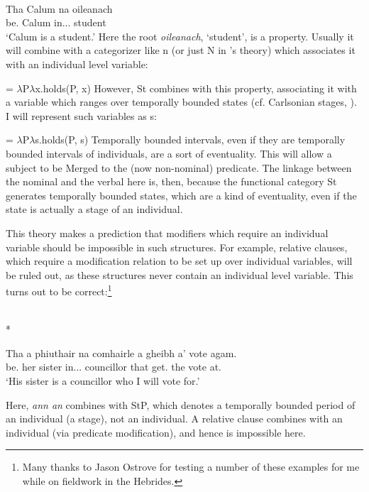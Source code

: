 \documentclass[output=paper]{langsci/langscibook}
\begin{document}
\ea {}\label{adger:ex:62}\\
 \gll  Tha Calum na oileanach\\
be.\Prs{} Calum in.\Poss.\Tsg.\M{} student\\
\glt \enquote*{Calum is a student.}
\z
Here the root \emph{oileanach}, `student', is a property. Usually it will
combine with a categorizer like n (or just N in \citeauthor{adgerbook}
\citeyear{adgerbook}'s theory) which
associates it with an individual level variable:\largerpage

\ea {} = $\lambda$P$\lambda$x.holds(P, x) \z
However, St combines with this property, associating it with a variable which
ranges over temporally bounded states (cf. Carlsonian stages,
\citealt{carlson:77}). I will represent such variables as s:

\ea {} = $\lambda$P$\lambda$s.holds(P, s) \z
Temporally bounded intervals, even if they are temporally bounded intervals of
individuals,  are a sort of eventuality. This will allow a subject to be Merged to the (now non-nominal)
predicate. The linkage between the nominal and the verbal here is, then,
because the functional category St generates temporally bounded states, which
are a kind of eventuality, even if the state is actually a stage of an
individual.\largerpage

This theory makes a prediction that modifiers which require an individual
variable should be impossible in such structures. For example, relative
clauses, which require a modification relation to be set up over individual
variables, will be ruled out, as these structures never contain an individual
level variable. This turns out to be correct:\footnote{Many thanks to Jason
Ostrove for testing a number of these examples for me while on fieldwork in the
Hebrides.}

\ea {}\\
    * \parbox[t]{\linewidth - \widthof{* }}{\gll  Tha a phiuthair na comhairle a gheibh a' vote agam. \\
           be.\Prs{} her sister in.\Poss.\Tsg.\glossF{} councillor that get.\Fut{} the vote at.\Fsg{}\\
    \glt \enquote*{His sister is a councillor who I will vote for.}}
\z
Here, \emph{ann an} combines with StP, which denotes a temporally bounded
period of an individual (a stage), not an individual. A relative clause
combines with an individual (via predicate modification), and hence is
impossible here.
\end{document}

